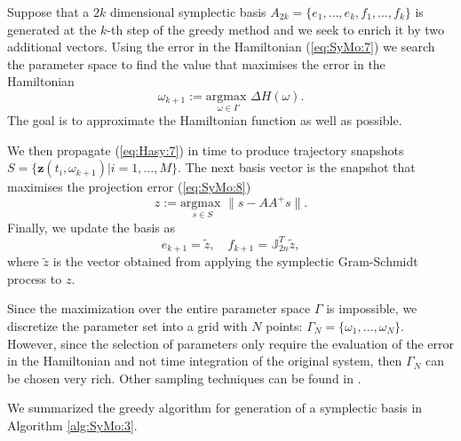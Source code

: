 Suppose that a $2k$ dimensional symplectic basis $A_{2k} = \{e_1,\dots ,e_k,f_1,\dots ,f_k\}$ is generated at the $k$-th step of the greedy method and we seek to enrich it by two additional vectors. Using the error in the Hamiltonian (\ref{eq:SyMo:7}) we search the parameter space to find the value that maximises the error in the Hamiltonian
\begin{equation}
	\omega_{k+1} := \underset{\omega\in \Gamma}{\text{argmax }}\Delta H(\omega).
\end{equation}
The goal is to approximate the Hamiltonian function as well as possible. 

We then propagate (\ref{eq:Hasy:7}) in time to produce trajectory snapshots $S=\{ \mathbf z(t_i,\omega_{k+1}) | i = 1,\dots,M \}$. The next basis vector is the snapshot that maximises the projection error (\ref{eq:SyMo:8})
\begin{equation}
	z := \underset{s\in S}{\text{argmax }} \| s - AA^+s \|.
\end{equation}
Finally, we update the basis as
\begin{equation}
	e_{k+1} = \tilde z, \quad f_{k+1} = \mathbb J_{2n}^T \tilde z,
\end{equation}
where $\tilde z$ is the vector obtained from applying the symplectic Gram-Schmidt process to $z$. 

Since the maximization over the entire parameter space $\Gamma$ is impossible, we discretize the parameter set into a grid with $N$ points: $\Gamma_N = \{ \omega_1,\dots,\omega_N\}$. However, since the selection of parameters only require the evaluation of the error in the Hamiltonian and not time integration of the original system, then $\Gamma_N$ can be chosen very rich. Other sampling techniques can be found in \cite{Quarteroni:2016wi}.

We summarized the greedy algorithm for generation of a symplectic basis in Algorithm \ref{alg:SyMo:3}.





